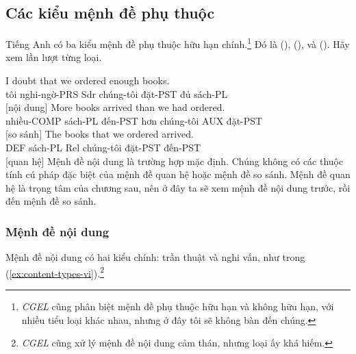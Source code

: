 \subsection{Các kiểu mệnh đề phụ thuộc}

Tiếng Anh có ba kiểu mệnh đề phụ thuộc hữu hạn chính.\footnote{\textit{CGEL} cũng phân biệt mệnh đề phụ thuộc hữu hạn và không hữu hạn, với nhiều tiểu loại khác nhau, nhưng ở đây tôi sẽ không bàn đến chúng.} Đó là  (),  (), và  (). Hãy xem lần lượt từng loại.

\ea \label{ex:sub-types-vi}
    \ea \gll I doubt that we ordered enough books.\\
        tôi nghi-ngờ-PRS Sdr chúng-tôi đặt-PST đủ sách-PL\\
    \glt {} [nội dung]
    \ex \gll More books arrived than we had ordered.\\
        nhiều-COMP sách-PL đến-PST hơn chúng-tôi AUX đặt-PST\\
    \glt {} [so sánh]
    \ex \gll The books that we ordered arrived.\\
        DEF sách-PL Rel chúng-tôi đặt-PST đến-PST\\
    \glt {} [quan hệ]
    \z
\z
Mệnh đề nội dung là trường hợp mặc định. Chúng không có các thuộc tính cú pháp đặc biệt của mệnh đề quan hệ hoặc mệnh đề so sánh. Mệnh đề quan hệ là trọng tâm của chương sau, nên ở đây ta sẽ xem mệnh đề nội dung trước, rồi đến mệnh đề so sánh.

\subsubsection{Mệnh đề nội dung}

Mệnh đề nội dung có hai kiểu chính: trần thuật và nghi vấn, như trong (\ref{ex:content-types-vi}).\footnote{\textit{CGEL} cũng xử lý mệnh đề nội dung cảm thán, nhưng loại ấy khá hiếm.}

